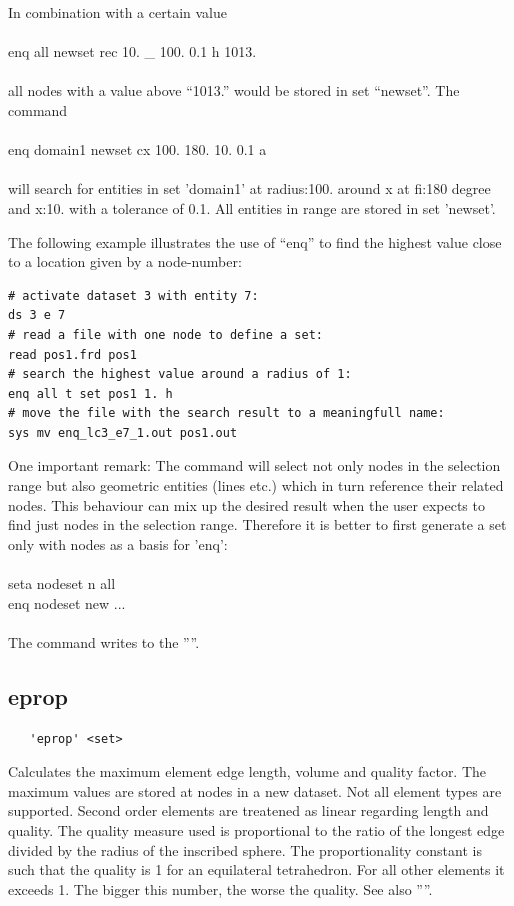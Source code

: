 \documentclass{article}
\begin{document}
In combination with a certain value\\\\
enq all newset rec 10. \_ 100. 0.1 h 1013.\\\\all nodes with a value above ``1013.'' would be stored in set ``newset''. The command \\\\
enq domain1 newset cx 100. 180. 10. 0.1 a\\\\
will search for entities in set 'domain1' at radius:100. around x at fi:180 degree and x:10. with a tolerance of 0.1. All entities in range are stored in set 'newset'.

The following example illustrates the use of ``enq'' to find the highest value close to a location given by a node-number: 
\begin{verbatim}
# activate dataset 3 with entity 7:
ds 3 e 7
# read a file with one node to define a set:
read pos1.frd pos1
# search the highest value around a radius of 1:
enq all t set pos1 1. h
# move the file with the search result to a meaningfull name:
sys mv enq_lc3_e7_1.out pos1.out
\end{verbatim}

One important remark:
The command will select not only nodes in the selection range but also geometric entities (lines etc.) which in turn reference their related nodes. This behaviour can mix up the desired result when the user expects to find just nodes in the selection range. Therefore it is better to first generate a set only with nodes as a basis for 'enq':\\\\
seta nodeset n all\\
enq nodeset new ...\\\\
The command writes to the ''''.


\subsection{\label{eprop}eprop}
\begin{verbatim}
   'eprop' <set>
\end{verbatim}
Calculates the maximum element edge length, volume and quality factor. The maximum values are stored at nodes in a new dataset. Not all element types are supported. Second order elements are treatened as linear regarding length and quality. The quality measure used is proportional to the ratio of the longest edge divided by the radius of the inscribed sphere. The proportionality constant is such that the quality is 1 for an equilateral tetrahedron. For all other elements it exceeds 1. The bigger this number, the worse the quality. See also ''''.
\end{document}
